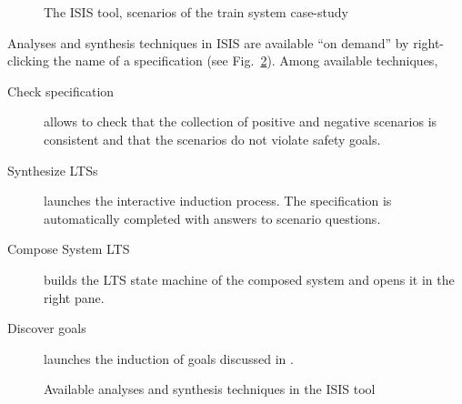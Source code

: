 \begin{figure}[H]
\centering{}
  \caption{The ISIS tool, scenarios of the train system case-study\label{image:isis-tool}}
\end{figure}

Analyses and synthesis techniques in ISIS are available ``on demand'' by right-clicking the name of a specification (see Fig.~\ref{image:isis-tool-context}). Among available techniques,

\begin{description}
\item[Check specification] allows to check that the collection of positive and negative scenarios is consistent and that the scenarios do not violate safety goals.
\item[Synthesize LTSs] launches the interactive induction process. The specification is automatically completed with answers to scenario questions.
\item[Compose System LTS] builds the LTS state machine of the composed system and opens it in the right pane.
\item[Discover goals] launches the induction of goals discussed in \cite{Damas:2011}.
\end{description}

\begin{figure}[H]
\centering{}
  \caption{Available analyses and synthesis techniques in the ISIS tool\label{image:isis-tool-context}}
\end{figure}

